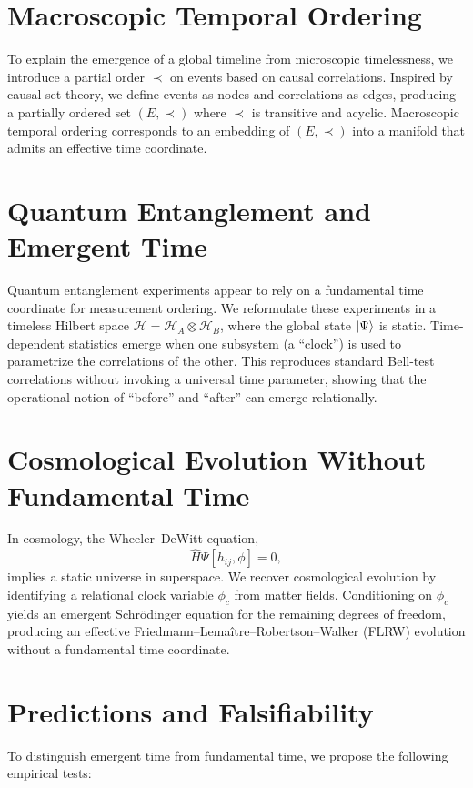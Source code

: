 \documentclass[12pt]{article}
\begin{document}
\section{Macroscopic Temporal Ordering}
To explain the emergence of a global timeline from microscopic timelessness, we introduce a partial order $\prec$ on events based on causal correlations. Inspired by causal set theory, we define events as nodes and correlations as edges, producing a partially ordered set $(E, \prec)$ where $\prec$ is transitive and acyclic. Macroscopic temporal ordering corresponds to an embedding of $(E, \prec)$ into a manifold that admits an effective time coordinate.

\section{Quantum Entanglement and Emergent Time}
Quantum entanglement experiments appear to rely on a fundamental time coordinate for measurement ordering. We reformulate these experiments in a timeless Hilbert space $\mathcal{H} = \mathcal{H}_A \otimes \mathcal{H}_B$, where the global state $\ket{\Psi}$ is static. Time-dependent statistics emerge when one subsystem (a ``clock'') is used to parametrize the correlations of the other. This reproduces standard Bell-test correlations without invoking a universal time parameter, showing that the operational notion of ``before'' and ``after'' can emerge relationally.

\section{Cosmological Evolution Without Fundamental Time}
In cosmology, the Wheeler--DeWitt equation,
\begin{equation}
\hat{H} \Psi[h_{ij}, \phi] = 0,
\end{equation}
implies a static universe in superspace. We recover cosmological evolution by identifying a relational clock variable $\phi_c$ from matter fields. Conditioning on $\phi_c$ yields an emergent Schrödinger equation for the remaining degrees of freedom, producing an effective Friedmann--Lemaître--Robertson--Walker (FLRW) evolution without a fundamental time coordinate.

\section{Predictions and Falsifiability}
To distinguish emergent time from fundamental time, we propose the following empirical tests:
\end{document}
